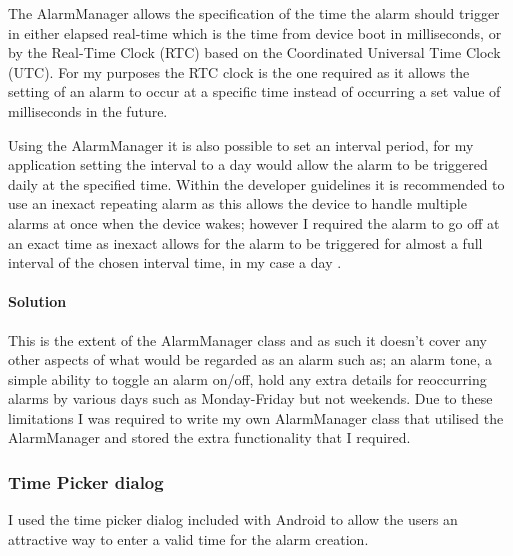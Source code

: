 The AlarmManager allows the specification of the time the alarm should
trigger in either elapsed real-time which is the time from device boot
in milliseconds, or by the Real-Time Clock (RTC) based on the
Coordinated Universal Time Clock (UTC). For my purposes the RTC clock is
the one required as it allows the setting of an alarm to occur at a
specific time instead of occurring a set value of milliseconds in the
future.

Using the AlarmManager it is also possible to set an interval period,
for my application setting the interval to a day would allow the alarm
to be triggered daily at the specified time. Within the developer
guidelines it is recommended to use an inexact repeating alarm as this
allows the device to handle multiple alarms at once when the device
wakes; however I required the alarm to go off at an exact time as
inexact allows for the alarm to be triggered for almost a full interval
of the chosen interval time, in my case a day \parencite{alarmManager}.

\paragraph{Solution}\label{solution}

This is the extent of the AlarmManager class and as such it doesn't
cover any other aspects of what would be regarded as an alarm such as;
an alarm tone, a simple ability to toggle an alarm on/off, hold any
extra details for reoccurring alarms by various days such as
Monday-Friday but not weekends. Due to these limitations I was required
to write my own AlarmManager class that utilised the AlarmManager and
stored the extra functionality that I required.

\subsubsection{Time Picker dialog}\label{time-picker-dialog}

I used the time picker dialog included with Android to allow the users
an attractive way to enter a valid time for the alarm creation.

